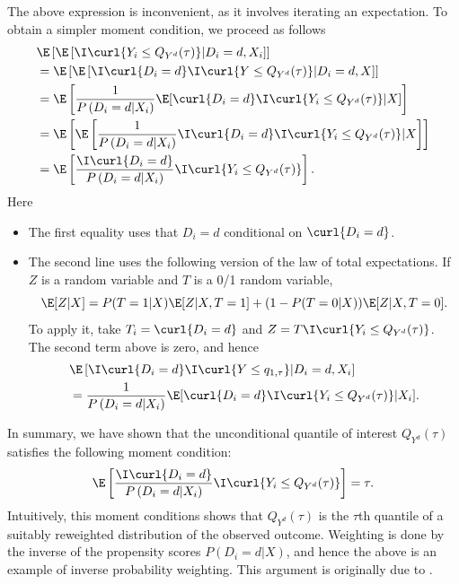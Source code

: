  The above expression is inconvenient, as it involves iterating an expectation. To obtain a simpler moment condition, we proceed as follows
 \begin{align}
 	&  \E\left[ \E\left[\I\curl{Y_i\leq Q_{Y^d}(\tau)  }| D_i=d, X_i\right]\right] \\
 	& =  \E\left[ \E\left[\I\curl{D_i=d}\I\curl{Y\leq Q_{Y^d}(\tau) }|D_i=d, X\right]\right]\\
 	& = \E\left[ \dfrac{1}{P\left(D_i=d|X_i\right)} \E[\curl{D_i=d} \I\curl{Y_i\leq  Q_{Y^d}(\tau) }|X] \right]\\
 	& =  \E\left[\E\left[  \dfrac{1}{P\left(D_i=d|X_i\right)} \I\curl{D_i=d} \I\curl{Y_i\leq  Q_{Y^d}(\tau) }|X\right] \right] \\
 	& = \E\left[  \dfrac{\I\curl{D_i=d} }{P\left(D_i=d|X_i\right)}\I\curl{Y_i\leq Q_{Y^d}(\tau) }\right].
 \end{align}
 Here
 \begin{itemize}
 	\item The first equality  uses that $D_i=d$ conditional on $\curl{D_i=d}$.
 	\item The second line uses the following version of the law of total expectations.  If $Z$ is a random variable and $T$ is a 0/1 random variable, 
 	\begin{equation}
 		\E[Z|X] =  P(T=1|X) \E[Z|X, T=1]  + (1-P(T=0|X)) \E[Z|X, T=0].
 	\end{equation}
 To apply it, take $T_i = \curl{D_i=d}$ and  $Z = T\I\curl{Y_i\leq Q_{Y^d}(\tau)}$.  The second term above is zero, and hence
 	\begin{align}
 & 		\E\left[\I\curl{D_i=d}\I\curl{Y\leq q_{1, \tau} }|D_i=d, X_i\right] 
 \\ 
 & = \dfrac{1}{P\left(D_i=d|X_i\right)} \E[\curl{D_i=d} \I\curl{Y_i\leq  Q_{Y^d}(\tau) }|X_i].
 	\end{align}
 \end{itemize}
 In summary, we have shown that the unconditional quantile of interest  $ Q_{Y^d}(\tau)$ satisfies the following moment condition:
 \begin{equation}
 	 \E\left[  \dfrac{\I\curl{D_i=d} }{P\left(D_i=d|X_i\right)}\I\curl{Y_i\leq Q_{Y^d}(\tau) }\right] = \tau.
 \end{equation}
  Intuitively, this moment conditions shows that $ Q_{Y^d}(\tau)$ is the $\tau$th quantile of a suitably reweighted distribution of the observed outcome. Weighting is done by the inverse of the propensity scores $P(D_i=d|X)$, and hence the above is an example of inverse probability weighting. 
 This argument is originally due to \cite{Firpo2007EfficientSemiparametricEstimation}.
   
